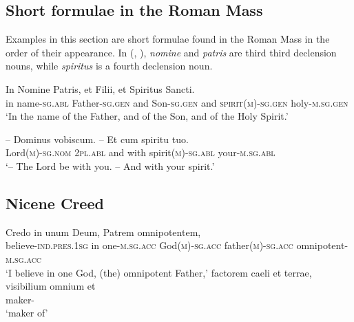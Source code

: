 \documentclass[a4paper, oneside]{report}
\newcommand{\form}[1]{\emph{#1}}
\newcommand*{\category}[1]{\textsc{#1}}
\newcommand{\translate}[1]{`#1'}
\begin{document}
\subsection{Short formulae in the Roman Mass}

Examples in this section are short formulae found in the Roman Mass
in the order of their appearance.
In (, ),
\form{nomine} and \form{patris} are third third declension nouns, 
while \form{spiritus} is a fourth declension noun. 

\begin{exe}
    \ex\label{ex:text.mass.1} \gll In Nomine Patris, et Filii, et Spiritus Sancti. \\
    in name-\category{sg}.\category{abl} Father-\category{sg}.\category{gen} 
    and Son-\category{sg}.\category{gen} 
    and \category{spirit}(\category{m})-\category{sg}.\category{gen}
    holy-\category{m}.\category{sg}.\category{gen} \\
    \glt \translate{In the name of the Father, and of the Son, and of the Holy Spirit.}

    \ex\label{ex:text.mass.2} \gll -- Dominus vobiscum. -- Et cum spiritu tuo. \\
    {} Lord(\category{m})-\category{sg}.\category{nom} 
    \category{2pl}.\category{abl} 
    {} and with spirit(\category{m})-\category{sg}.\category{abl} 
    your-\category{m}.\category{sg}.\category{abl} \\
    \glt \translate{-- The Lord be with you. -- And with your spirit.}
    
    \ex 
\end{exe}

\subsection{Nicene Creed}

\begin{exe}
    \ex \gll Credo in unum Deum, Patrem omnipotentem, \\
    believe-\category{ind}.\category{pres}.\category{1sg} in 
    one-\category{m}.\category{sg}.\category{acc} 
    God(\category{m})-\category{sg}.\category{acc} 
    father(\category{m})-\category{sg}.\category{acc}
    omnipotent-\category{m}.\category{sg}.\category{acc} \\
    \glt \translate{I believe in one God, (the) omnipotent Father,} 
    \ex \gll factorem caeli et terrae, visibilium omnium et \\ 
    maker- \\
    \glt \translate{maker of}
\end{exe}
\end{document}
